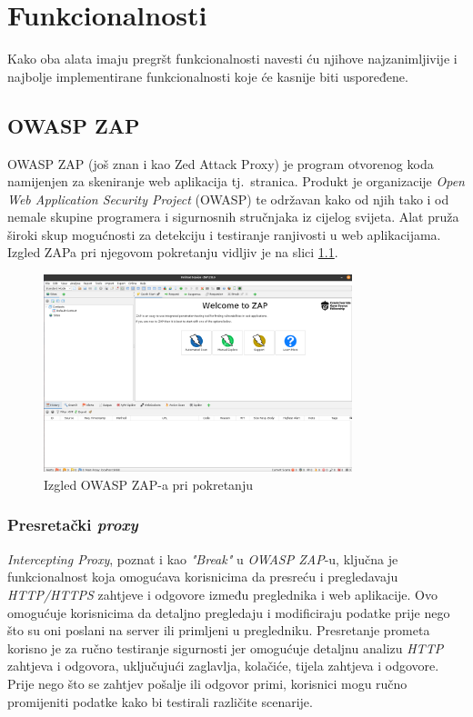 \chapter{Funkcionalnosti}
Kako oba alata imaju pregršt funkcionalnosti navesti ću njihove najzanimljivije i najbolje implementirane funkcionalnosti 
koje će kasnije biti uspoređene.
\section{OWASP ZAP}
OWASP ZAP (još znan i kao Zed Attack Proxy) je program otvorenog koda namijenjen
za skeniranje web aplikacija tj.\ stranica. Produkt je organizacije \textit{Open Web Application 
Security Project} (OWASP) te održavan kako od njih tako i od nemale skupine programera 
i sigurnosnih stručnjaka iz cijelog svijeta. Alat pruža široki skup mogućnosti 
za detekciju i testiranje ranjivosti u web aplikacijama. Izgled ZAPa pri njegovom pokretanju vidljiv je na slici \ref{slk:owasp_start}.
\begin{figure}[H]
    \centering
    \includegraphics[width=0.8\textwidth]{slike/zap_start.png}
    \caption{Izgled OWASP ZAP-a pri pokretanju}
    \label{slk:owasp_start}
  \end{figure}

\subsection{Presretački \textit{proxy}}
\textit{Intercepting Proxy}, poznat i kao \textit{"Break"} u \textit{OWASP ZAP}-u, ključna je funkcionalnost koja omogućava 
korisnicima da presreću i pregledavaju \textit{HTTP/HTTPS} zahtjeve i odgovore između preglednika i web aplikacije. Ovo omogućuje 
korisnicima da detaljno pregledaju i modificiraju podatke prije nego što su oni poslani na server ili primljeni u pregledniku. 
Presretanje prometa korisno je za ručno testiranje sigurnosti jer omogućuje detaljnu analizu 
\textit{HTTP} zahtjeva i odgovora, uključujući zaglavlja, kolačiće, tijela zahtjeva i odgovore. 
Prije nego što se zahtjev pošalje ili odgovor primi, korisnici mogu ručno promijeniti podatke 
kako bi testirali različite scenarije.

